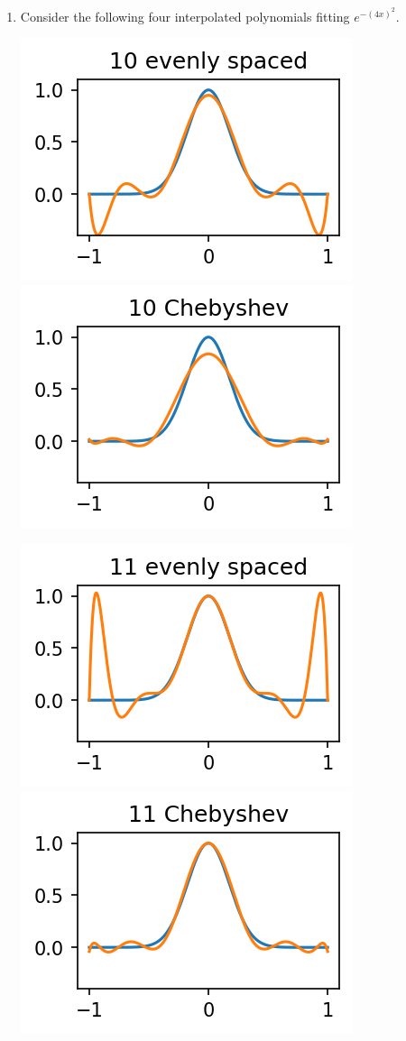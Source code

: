 \documentclass[12pt,letterpaper,noanswers]{exam}
\begin{document}
\begin{enumerate}[resume]
\item Consider the following four interpolated polynomials fitting $e^{-(4x)^2}$.

\includegraphics{AM111-F23-CourseNotes/img/C10-gaussian10.png}
\includegraphics{AM111-F23-CourseNotes/img/C10-gaussian10Ch.png}

\includegraphics{AM111-F23-CourseNotes/img/C10-gaussian11.png}
\includegraphics{AM111-F23-CourseNotes/img/C10-gaussian11Ch.png}


\end{enumerate}
\end{document}
